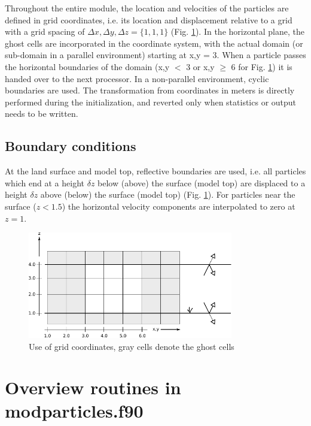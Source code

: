 \documentclass[twoside,a4paper]{report}
\begin{document}
Throughout the entire module, the location and velocities of the particles are defined in grid coordinates, i.e. its location and displacement relative to a grid with a grid spacing of $\Delta x, \Delta y, \Delta z = \{1,1,1\}$ (Fig. \ref{fig:grid_coord}). In the horizontal plane, the ghost cells are incorporated in the coordinate system, with the actual domain (or sub-domain in a parallel environment) starting at x,y = 3. When a particle passes the horizontal boundaries of the domain (x,y $<$ 3 or x,y $\geq$ 6 for Fig. \ref{fig:grid_coord}) it is handed over to the next processor. In a non-parallel environment, cyclic boundaries are used. The transformation from coordinates in meters is directly performed during the initialization, and reverted only when statistics or output needs to be written. \newline

\subsection{Boundary conditions}

At the land surface and model top, reflective boundaries are used, i.e. all particles which end at a height $\delta z$ below (above) the surface (model top) are displaced to a height $\delta z$ above (below) the surface (model top) (Fig. \ref{fig:grid_coord}). For particles near the surface ($z<1.5$) the horizontal velocity components are interpolated to zero at $z=1$. 

\begin{figure}[h]
  \begin{center}
    \includegraphics[width=0.8\textwidth]{figures_LPTM/grid_coord.pdf}
    \caption{Use of grid coordinates, gray cells denote the ghost cells}
    \label{fig:grid_coord}       %
  \end{center}
\end{figure}

\section{Overview routines in modparticles.f90}
\end{document}
